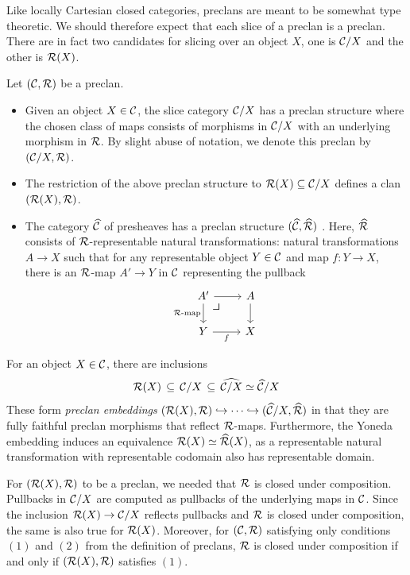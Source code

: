 Like locally Cartesian closed categories,
preclans are meant to be somewhat type theoretic.
We should therefore expect that each slice
of a preclan is a preclan.
There are in fact two candidates for slicing over an object $X$,
one is $\mathcal{C} / X$ and the other is $\mathcal{R}(X)$.

\begin{definition}
  Let $(\mathcal{C}, \mathcal{R})$ be a preclan.
  \begin{itemize}
  \item Given an object $X \in \mathcal{C}$, the slice category $\mathcal{C} / X$
    has a preclan structure where the chosen class of maps consists of
    morphisms in $\mathcal{C} / X$ with an underlying morphism in $\mathcal{R}$.
    By slight abuse of notation, we denote this preclan by $(\mathcal{C}/X, \mathcal{R})$.
  \item The restriction of the above preclan structure to $\mathcal{R}(X) \subseteq \mathcal{C}/X$
    defines a clan $(\mathcal{R}(X), \mathcal{R})$.
  \item
    The category $\widehat{\mathcal{C}}$ of presheaves has a preclan structure $(\widehat{\mathcal{C}}, \widehat{\mathcal{R}})$
    \cite[Proposition 1.6.5]{joyal2017}.
    Here, $\widehat{\mathcal{R}}$ consists of $\mathcal{R}$-representable natural transformations:
    natural transformations $A \to X$
    such that for any representable object $Y \in \mathcal{C}$ and map $f : Y \to X$,
    there is an $\mathcal{R}$-map $A' \to Y$ in $\mathcal{C}$ representing the pullback
    \[\begin{tikzcd}
        {A'} \pbcorner & A \\
        Y & X
        \arrow[from=1-1, to=1-2]
        \arrow["{\RR\text{-map}}"', from=1-1, to=2-1]
        \arrow[from=1-2, to=2-2]
        \arrow["f"', from=2-1, to=2-2]
      \end{tikzcd}\]
  \end{itemize}
  For an object $X \in \mathcal{C}$,
  there are inclusions
  \[
    \mathcal{R}(X) \,\subseteq\, \mathcal{C}/X \,\subseteq\, \widehat{\mathcal{C}/X} \simeq \widehat{\mathcal{C}}/X
  \]
  These form \emph{preclan embeddings}
  $(\mathcal{R}(X),\mathcal{R}) \hookrightarrow \cdots \hookrightarrow (\widehat{\mathcal{C}}/X, \widehat{\mathcal{R}})$
  in that they are fully faithful preclan morphisms that reflect $\mathcal{R}$-maps.
  Furthermore, the Yoneda embedding induces an equivalence $\mathcal{R}(X) \simeq \widehat{\mathcal{R}}(X)$,
  as a representable natural transformation with representable codomain
  also has representable domain.
\end{definition}

\begin{remark}
  For $(\mathcal{R}(X), \mathcal{R})$ to be a preclan, we needed that $\mathcal{R}$ is closed under composition.
  Pullbacks in $\mathcal{C} / X$ are computed as pullbacks of the underlying maps in $\mathcal{C}$.
  Since the inclusion $\mathcal{R}(X) \to \mathcal{C} / X$
  reflects pullbacks and $\mathcal{R}$ is closed under composition,
  the same is also true for $\mathcal{R}(X)$.
  Moreover, for $(\mathcal{C},\mathcal{R})$ satisfying only conditions
  $(1)$ and $(2)$ from the definition of preclans,
  $\mathcal{R}$ is closed under composition if and only if
  $(\mathcal{R}(X),\mathcal{R})$ satisfies $(1)$.
\end{remark}

